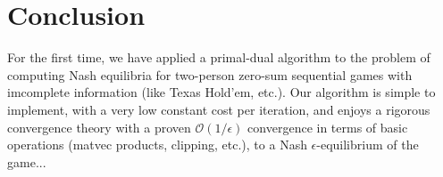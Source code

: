 \documentclass[12pt]{article}
\begin{document}

\section{Conclusion}
For the first time, we have applied a primal-dual algorithm to the problem of computing Nash equilibria for two-person zero-sum sequential games with imcomplete information (like Texas Hold'em, etc.). Our algorithm is simple to implement, with a very low constant cost per iteration, and enjoys a rigorous convergence theory with a proven $\mathcal{O}(1/\epsilon)$ convergence in terms of basic operations (matvec products, clipping, etc.), to a Nash $\epsilon$-equilibrium of the game...
\end{document}
